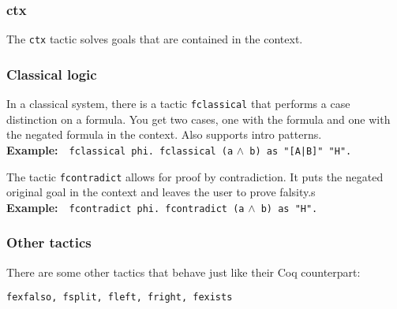 \documentclass[12pt, a4paper]{article}
\newcommand{\coq}[1]{\texttt{#1}}
\newcommand{\example}[1]{\medskip\\\textbf{Example:}~~#1}
\begin{document}
\subsubsection{\ttfamily ctx}

The \texttt{ctx} tactic solves goals that are contained in the context.


\subsubsection{Classical logic}

In a classical system, there is a tactic \texttt{fclassical} that performs a case distinction on a formula.
You get two cases, one with the formula and one with the negated formula in the context.
Also supports intro patterns.
\example{\coq{fclassical phi. fclassical (a} $\land$\coq{ b) as "[A|B]" "H".}}

\medskip\noindent
The tactic \texttt{fcontradict} allows for proof by contradiction.
It puts the negated original goal in the context and leaves the user to prove falsity.s
\example{\coq{fcontradict phi. fcontradict (a} $\land$\coq{ b) as "H".}}

\subsubsection{Other tactics}

There are some other tactics that behave just like their Coq counterpart:
\begin{center}
	\texttt{fexfalso, fsplit, fleft, fright, fexists}
\end{center}
\end{document}
